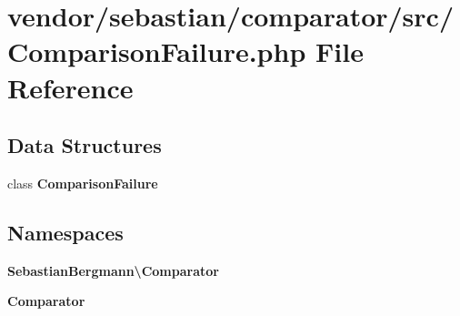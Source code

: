 \section{vendor/sebastian/comparator/src/\+Comparison\+Failure.php File Reference}
\label{_comparison_failure_8php}
\subsection*{Data Structures}
\begin{DoxyCompactItemize}
\item 
class {\bf Comparison\+Failure}
\end{DoxyCompactItemize}
\subsection*{Namespaces}
\begin{DoxyCompactItemize}
\item 
 {\bf Sebastian\+Bergmann\textbackslash{}\+Comparator}
\item 
 {\bf Comparator}
\end{DoxyCompactItemize}
